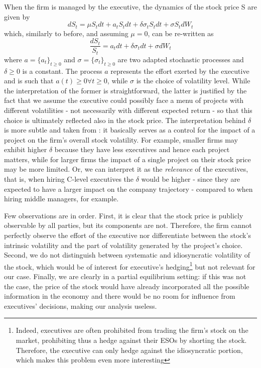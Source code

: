 When the firm is managed by the executive, the dynamics of the stock price S are given by 
$$ dS_t = \mu S_t dt + a_t S_t dt + \delta \sigma_t S_t dt + \sigma S_t dW_t $$
which, similarly to before, and assuming $\mu = 0$, can be re-written as 
$$ \frac{dS_t}{S_t} = a_t dt + \delta \sigma_t dt + \sigma dW_t $$
where $a = \{a_t\}_{t \ge 0}$ and $\sigma = \{\sigma_t\}_{t \ge 0}$ are two adapted stochastic processes and $\delta \ge 0$ is a constant. The process $a$ represents the effort exerted by the executive and is such that $a(t) \ge 0 \forall t \ge 0$, while $\sigma$ is the choice of volatility level. While the interpretation of the former is straightforward, the latter is justified by the fact that we assume the executive could possibly face a menu of projects with different volatilities - not necessarily with different expected return - so that this choice is ultimately reflected also in the stock price. 
The interpretation behind $\delta$ is more subtle and taken from \cite{cadenillas2005executive}: it basically serves as a control for the impact of a project on the firm's overall stock volatility. For example, smaller firms may exhibit higher $\delta$ because they have less executives and hence each project matters, while for larger firms the impact of a single project on their stock price may be more limited. Or, we can interpret it as the \textit{relevance} of the executives, that is, when hiring C-level executives the $\delta$ would be higher - since they are expected to have a larger impact on the company trajectory - compared to when hiring middle managers, for example.

Few observations are in order. First, it is clear that the stock price is publicly observable by all parties, but its components are not. Therefore, the firm cannot perfectly observe the effort of the executive nor differentiate between the stock's intrinsic volatility and the part of volatility generated by the project's choice. Second, we do not distinguish between systematic and idiosyncratic volatility of the stock, which would be of interest for executive's hedging\footnote{Indeed, executives are often prohibited from trading the firm's stock on the market, prohibiting thus a hedge against their ESOs by shorting the stock. Therefore, the executive can only hedge against the idiosyncratic portion, which makes this problem even more interesting} but not relevant for our case. Finally, we are clearly in a partial equilibrium setting: if this was not the case, the price of the stock would have already incorporated all the possible information in the economy and there would be no room for influence from executives' decisions, making our analysis useless.


